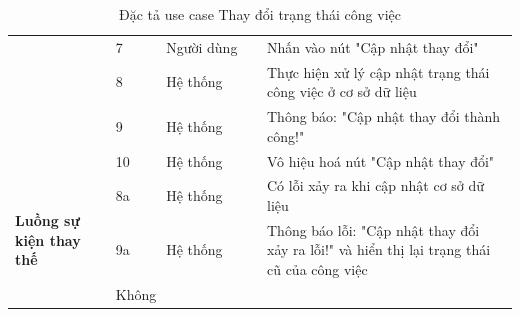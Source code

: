 \documentclass[../DoAn.tex]{subfiles}
\begin{document}
\begin{table}[ht]
\begin{tabular}{| p{0.2\linewidth} | p{0.1\linewidth} | p{0.2\linewidth} | p{0.5\linewidth} |}
                                                                     & \multicolumn{1}{p{0.1\linewidth}|}{7}                                                          & \multicolumn{1}{p{0.2\linewidth}|}{Người dùng}             & \multicolumn{1}{p{0.5\linewidth}|}{Nhấn vào nút "Cập nhật thay đổi"}                                                           \\ \cline{2-4}
                                                                     & \multicolumn{1}{p{0.1\linewidth}|}{8}                                                          & \multicolumn{1}{p{0.2\linewidth}|}{Hệ thống}               & \multicolumn{1}{p{0.5\linewidth}|}{Thực hiện xử lý cập nhật trạng thái công việc ở cơ sở dữ liệu}                              \\ \cline{2-4}
                                                                     & \multicolumn{1}{p{0.1\linewidth}|}{9}                                                          & \multicolumn{1}{p{0.2\linewidth}|}{Hệ thống}               & \multicolumn{1}{p{0.5\linewidth}|}{Thông báo: "Cập nhật thay đổi thành công!"}                                                 \\ \cline{2-4}
                                                                     & \multicolumn{1}{p{0.1\linewidth}|}{10}                                                         & \multicolumn{1}{p{0.2\linewidth}|}{Hệ thống}               & \multicolumn{1}{p{0.5\linewidth}|}{Vô hiệu hoá nút "Cập nhật thay đổi"}                                                        \\ \hline

        \multirow{4}{\linewidth}{\textbf{Luồng sự kiện thay thế}}    & \multicolumn{1}{p{0.1\linewidth}|}{8a}                                                         & \multicolumn{1}{p{0.2\linewidth}|}{Hệ thống}               & \multicolumn{1}{p{0.5\linewidth}|}{Có lỗi xảy ra khi cập nhật cơ sở dữ liệu}                                                   \\ \cline{2-4}
                                                                     & \multicolumn{1}{p{0.1\linewidth}|}{9a}                                                         & \multicolumn{1}{p{0.2\linewidth}|}{Hệ thống}               & \multicolumn{1}{p{0.5\linewidth}|}{Thông báo lỗi: "Cập nhật thay đổi xảy ra lỗi!" và hiển thị lại trạng thái cũ của công việc} \\ \hline

        \textbf{Hậu điều kiện}                                       & \multicolumn{3}{p{0.1\linewidth}|}{Không}                                                                                                                                                                                                                                                    \\ \hline
    \end{tabular}%
    \renewcommand{\arraystretch}{1}
    \caption{Đặc tả use case Thay đổi trạng thái công việc}
    \label{tab:UC03}
\end{table}
\end{document}
